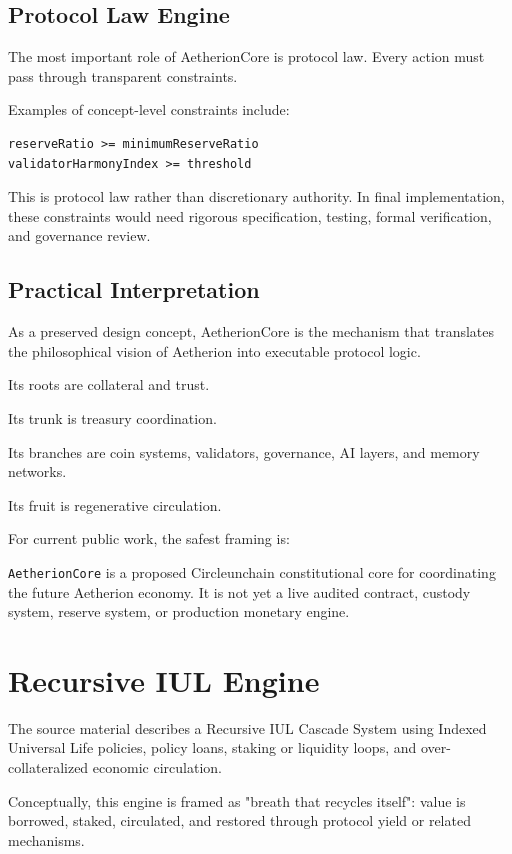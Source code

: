 ﻿\documentclass[12pt]{article}
\begin{document}
\subsection{Protocol Law Engine}


The most important role of AetherionCore is protocol law. Every action must pass through transparent constraints.

Examples of concept-level constraints include:

\begin{verbatim}
reserveRatio >= minimumReserveRatio
validatorHarmonyIndex >= threshold
\end{verbatim}

This is protocol law rather than discretionary authority. In final implementation, these constraints would need rigorous specification, testing, formal verification, and governance review.

\subsection{Practical Interpretation}


As a preserved design concept, AetherionCore is the mechanism that translates the philosophical vision of Aetherion into executable protocol logic.

Its roots are collateral and trust.

Its trunk is treasury coordination.

Its branches are coin systems, validators, governance, AI layers, and memory networks.

Its fruit is regenerative circulation.

For current public work, the safest framing is:

\texttt{AetherionCore} is a proposed Circleunchain constitutional core for coordinating the future Aetherion economy. It is not yet a live audited contract, custody system, reserve system, or production monetary engine.

\section{Recursive IUL Engine}


The source material describes a Recursive IUL Cascade System using Indexed Universal Life policies, policy loans, staking or liquidity loops, and over-collateralized economic circulation.

Conceptually, this engine is framed as "breath that recycles itself": value is borrowed, staked, circulated, and restored through protocol yield or related mechanisms.
\end{document}
